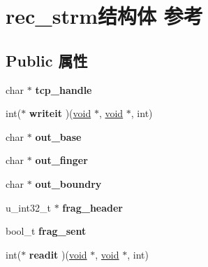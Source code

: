 \hypertarget{structrec__strm}{}\section{rec\+\_\+strm结构体 参考}
\label{structrec__strm}
\subsection*{Public 属性}
\begin{DoxyCompactItemize}
\item 
\mbox{\label{structrec__strm_a596de5ab5744357c696f2c7257bd4d53}} 
char $\ast$ {\bfseries tcp\+\_\+handle}
\item 
\mbox{\label{structrec__strm_aac41b73b2443c16c37f561071a71ad9b}} 
int($\ast$ {\bfseries writeit} )(\hyperlink{interfacevoid}{void} $\ast$, \hyperlink{interfacevoid}{void} $\ast$, int)
\item 
\mbox{\label{structrec__strm_a84ef0bb41174e8d920f9660b7fcda2d8}} 
char $\ast$ {\bfseries out\+\_\+base}
\item 
\mbox{\label{structrec__strm_aa351e11e3b4a36e0fa8b5e1eaaf177e5}} 
char $\ast$ {\bfseries out\+\_\+finger}
\item 
\mbox{\label{structrec__strm_a211649f4bb6c70798aaa2dc340abc63c}} 
char $\ast$ {\bfseries out\+\_\+boundry}
\item 
\mbox{\label{structrec__strm_a736be78af12470e68d4234810edf76c1}} 
u\+\_\+int32\+\_\+t $\ast$ {\bfseries frag\+\_\+header}
\item 
\mbox{\label{structrec__strm_a9ff756ffe44d90cc23375e43d2fbebd6}} 
bool\+\_\+t {\bfseries frag\+\_\+sent}
\item 
\mbox{\label{structrec__strm_ac1b94ea00ec26e5d1b5ec5d2a2bb92ae}} 
int($\ast$ {\bfseries readit} )(\hyperlink{interfacevoid}{void} $\ast$, \hyperlink{interfacevoid}{void} $\ast$, int)
\item 
\mbox{\label{structrec__strm_a6750e42ae9d619b38b42752e3a6ab1fd}} 

\end{DoxyCompactItemize}
